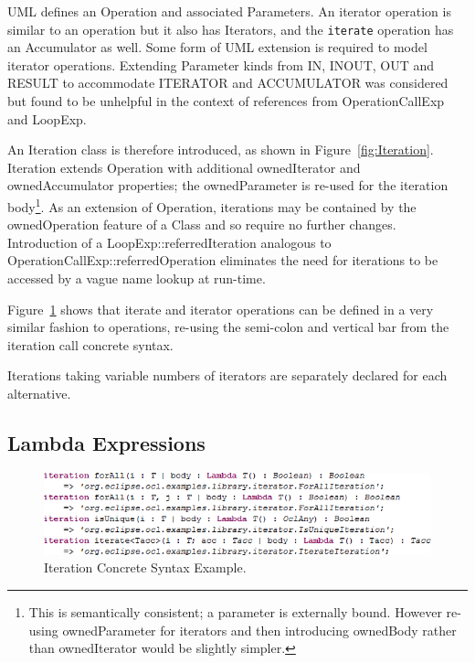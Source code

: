 \documentclass{eceasst}
\begin{document}
UML defines an Operation and associated Parameters. An iterator operation is similar to an operation but it also has Iterators, and the \verb|iterate| operation has an Accumulator as well. Some form of UML extension is required to model iterator operations. Extending Parameter kinds from  IN, INOUT, OUT and RESULT to accommodate ITERATOR and ACCUMULATOR was considered but found to be unhelpful in the context of references from OperationCallExp and LoopExp.

An Iteration class is therefore introduced, as shown in Figure~\ref{fig:Iteration}. Iteration extends Operation with additional ownedIterator and ownedAccumulator properties; the ownedParameter is re-used for the iteration body\footnote{This is semantically consistent; a parameter is externally bound. However re-using ownedParameter for iterators and then introducing ownedBody rather than ownedIterator would be slightly simpler.}. As an extension of Operation, iterations may be contained by the ownedOperation feature of a Class and so require no further changes. Introduction of a LoopExp::referredIteration analogous to OperationCallExp::referredOperation eliminates the need for iterations to be accessed by a vague name lookup at run-time.

Figure~\ref{fig:IterationExample} shows that iterate and iterator operations can be defined in a very similar fashion to operations, re-using the semi-colon and vertical bar from the iteration call concrete syntax. 

Iterations taking variable numbers of iterators are separately declared for each alternative.

\subsection{Lambda Expressions}

\begin{figure}
  \begin{center}
    \includegraphics[width=5.75in]{IterationExample.png}
  \end{center}
  \caption{Iteration Concrete Syntax Example.}
  \label{fig:IterationExample}
\end{figure}
\end{document}
